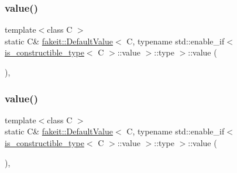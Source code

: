 \subsubsection{\texorpdfstring{value()}{value()}\hspace{0.1cm}{\footnotesize\ttfamily [5/9]}}
{\footnotesize\ttfamily template$<$class C $>$ \\
static C\& \mbox{\hyperlink{structfakeit_1_1DefaultValue}{fakeit\+::\+Default\+Value}}$<$ C, typename std\+::enable\+\_\+if$<$ \mbox{\hyperlink{structfakeit_1_1is__constructible__type}{is\+\_\+constructible\+\_\+type}}$<$ C $>$\+::value $>$\+::type $>$\+::value (\begin{DoxyParamCaption}{ }\end{DoxyParamCaption})\hspace{0.3cm}{\ttfamily [inline]}, {\ttfamily [static]}}

\mbox{\label{structfakeit_1_1DefaultValue_3_01C_00_01typename_01std_1_1enable__if_3_01is__constructible__typeba4172eb6f54b4f010948e5b77fe8b8f_ae142b421f47b7029f531c0a996e876e7}} 
\subsubsection{\texorpdfstring{value()}{value()}\hspace{0.1cm}{\footnotesize\ttfamily [6/9]}}
{\footnotesize\ttfamily template$<$class C $>$ \\
static C\& \mbox{\hyperlink{structfakeit_1_1DefaultValue}{fakeit\+::\+Default\+Value}}$<$ C, typename std\+::enable\+\_\+if$<$ \mbox{\hyperlink{structfakeit_1_1is__constructible__type}{is\+\_\+constructible\+\_\+type}}$<$ C $>$\+::value $>$\+::type $>$\+::value (\begin{DoxyParamCaption}{ }\end{DoxyParamCaption})\hspace{0.3cm}{\ttfamily [inline]}, {\ttfamily [static]}}


